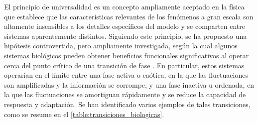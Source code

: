 El principio de universalidad es un concepto ampliamente aceptado en la física que establece que las características relevantes de los fenómenos a gran escala son altamente insensibles a los detalles específicos del modelo y se comparten entre sistemas aparentemente distintos. Siguiendo este principio, se ha propuesto una hipótesis controvertida, pero ampliamente investigada, según la cual algunos sistemas biológicos pueden obtener beneficios funcionales significativos al operar cerca del punto crítico de una transición de fase \cite{munoz_colloquium_2018,hidalgo_information-based_2014,kauffman_origins_1993,bak_how_1996,chialvo_brain_2008,chialvo_emergent_2010,plenz_critical_2013,niebur_criticality_2014,shew_functional_2013,cocchi_criticality_2017,zimmern_why_2020}. En particular, estos sistemas operarían en el límite entre una fase activa o caótica, en la que las fluctuaciones son amplificadas y la información se corrompe, y una fase inactiva u ordenada, en la que las fluctuaciones se amortiguan rápidamente y se reduce la capacidad de respuesta y adaptación. Se han identificado varios ejemplos de tales transiciones, como se resume en el \cref{table:transiciones_biologicas}.







